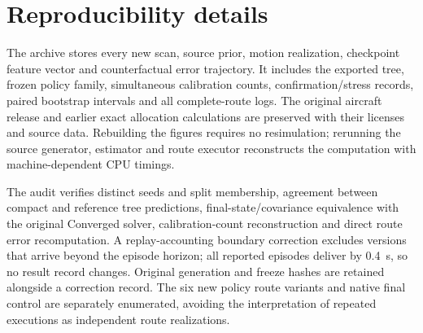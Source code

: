 \section{Reproducibility details}\label{app:reproducibility}
The archive stores every new scan, source prior, motion realization, checkpoint feature vector and counterfactual error trajectory. It includes the exported tree, frozen policy family, simultaneous calibration counts, confirmation/stress records, paired bootstrap intervals and all complete-route logs. The original aircraft release and earlier exact allocation calculations are preserved with their licenses and source data. Rebuilding the figures requires no resimulation; rerunning the source generator, estimator and route executor reconstructs the computation with machine-dependent CPU timings.

The audit verifies distinct seeds and split membership, agreement between compact and reference tree predictions, final-state/covariance equivalence with the original Converged solver, calibration-count reconstruction and direct route error recomputation. A replay-accounting boundary correction excludes versions that arrive beyond the episode horizon; all reported episodes deliver by 0.4~s, so no result record changes. Original generation and freeze hashes are retained alongside a correction record. The six new policy route variants and native final control are separately enumerated, avoiding the interpretation of repeated executions as independent route realizations.
